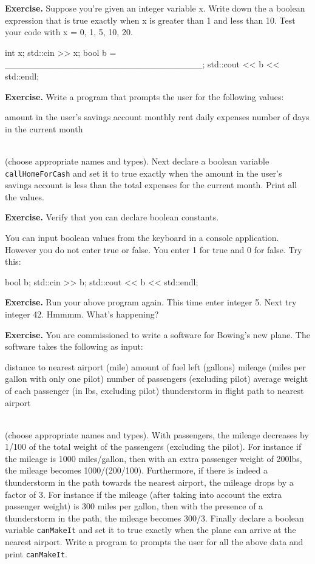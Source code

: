 {{{{{{\textbf{Exercise.} Suppose you're given an integer variable x. Write down the a boolean expression that is true exactly when x is greater than 1 and less than 10. Test your code with x = 0, 1, 5, 10, 20.
\begin{console}
int x;
std::cin >> x;
bool b = _______________________________;
std::cout << b << std::endl;
\end{console}

\textbf{Exercise.} Write a program that prompts the user for the following values:\\
\begin{tightlist}
\li amount in the user's savings account
\li monthly rent
\li daily expenses
\li number of days in the current month
\end{tightlist}\\
(choose appropriate names and types). Next declare a boolean variable
\verb!callHomeForCash! and set it to true exactly when the amount in the
user's savings account is less than the total expenses for the current
month. Print all the values.


\textbf{Exercise.} Verify that you can declare boolean constants.\\


You can input boolean values from the keyboard in a console application.
However you do not enter true or false. You enter 1 for true and 0 for
false. Try this:\\
\begin{console}
bool b;
std::cin >> b;
std::cout << b << std::endl;
\end{console}
\textbf{Exercise.} Run your above program again. This time enter integer 5. Next try integer 42. Hmmmm. What's happening?

\textbf{Exercise.} You are commissioned to write a software for Bowing's new
plane. The software takes the following as input:
\begin{tightlist}
\li distance to nearest airport (mile)
\li amount of fuel left (gallons)
\li mileage (miles per gallon with only one pilot)
\li number of passengers (excluding pilot)
\li average weight of each passenger (in lbs, excluding pilot)
\li thunderstorm in flight path to nearest airport
\end{tightlist}\\
(choose appropriate names and types). With passengers, the mileage
decreases by 1/100 of the total weight of the passengers (excluding the
pilot). For instance if the mileage is 1000 miles/gallon, then with an extra
passenger weight of 200lbs, the mileage becomes 1000/(200/100).
Furthermore, if there is indeed a thunderstorm in the path towards the
nearest airport, the mileage drops by a factor of 3. For instance if the
mileage (after taking into account the extra passenger weight) is 300
miles per gallon, then with the presence of a thunderstorm in the path,
the mileage becomes 300/3. Finally declare a boolean variable
\verb!canMakeIt! and set it to true exactly when the plane can arrive at the
nearest airport. Write a program to prompts the user for all the above
data and print \verb!canMakeIt!.

}}}}}}
